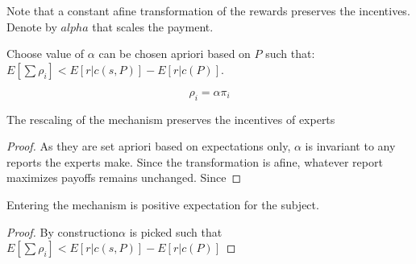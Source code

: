 Note that a constant afine transformation of the rewards preserves the incentives. Denote by $alpha$ that scales the payment.

\begin{mech}

Choose value of $\alpha$ can be chosen apriori based on $P$ such that: $ E[\sum \rho_i] < E[r|c(s,P)] - E[r|c(P)] $. 


\[
  \rho_i  = \alpha \pi_i
\]

\end{mech}


\begin{lem}
	The rescaling of the mechanism preserves the incentives of experts
\end{lem}

\begin{proof}
	As they are set apriori based on expectations only, $\alpha$ is invariant to any reports the experts make. Since the transformation is afine, whatever report maximizes payoffs remains unchanged. Since 
\end{proof}


\begin{lem}
	Entering the mechanism is positive expectation for the subject.
\end{lem}

\begin{proof}
  By construction$ \alpha $ is picked such that $E[\sum \rho_i] < E[r|c(s,P)] - E[r|c(P)]$
\end{proof}


